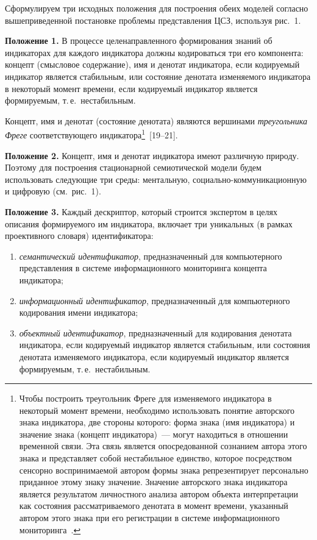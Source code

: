 \begin{multicols}{2}
   Сформулируем три исходных положения для построения обеих моделей согласно 
вышеприведенной постановке проблемы представления ЦСЗ, используя рис.~1.

   \textbf{Положение 1.} В процессе целенаправленного формирования знаний об 
индикаторах для каждого индикатора должны кодироваться три его компонента: концепт 
(смысловое содержание), имя и денотат индикатора, если кодируемый индикатор является 
стабильным, или состояние денотата изменяемого индикатора в некоторый момент времени, 
если кодируемый индикатор является формируемым, т.\,е.\ нестабильным.
   
   Концепт, имя и денотат (состояние денотата) являются вершинами \textit{треугольника 
Фреге} соответствующего индикатора\footnote{Чтобы построить треугольник Фреге для 
изменяемого индикатора в некоторый момент времени, необходимо 
использовать понятие авторского знака 
индикатора, две стороны которого: форма знака (имя индикатора) и значение знака (концепт 
индикатора)~--- могут находиться в отношении временной связи. Эта связь является опосредованной 
сознанием автора этого знака и представляет собой нестабильное единство, которое посредством сенсорно 
воспринимаемой автором формы знака репрезентирует персонально приданное этому знаку значение. 
Значение авторского знака индикатора является результатом личностного анализа автором объекта 
интерпретации как состояния рассматриваемого денотата в момент времени, указанный автором этого 
знака при его регистрации в системе информационного мониторинга~\cite{8-zat, 15-zat}.}~[19--21].
   
   \textbf{Положение 2.} Концепт, имя и денотат индикатора имеют различную природу. 
Поэтому для построения стационарной семиотической модели будем использовать 
следующие три среды: ментальную, социально-коммуникационную и цифровую 
(см.\ рис.~1).
   
   \textbf{Положение 3.} Каждый дескриптор, который строится экспертом в целях 
описания фор\-ми\-ру\-емо\-го им индикатора, включает три уникальных (в рамках проективного 
словаря) идентификатора:
   \begin{enumerate}[(1)]
\item \textit{семантический идентификатор}, предназначенный для компьютерного 
представления в системе информационного мониторинга концепта индикатора;
\item \textit{информационный идентификатор}, предназначенный для компьютерного 
кодирования имени индикатора;
\item \textit{объектный идентификатор}, предназначенный для кодирования денотата 
индикатора, если кодируемый индикатор является стабильным, или состояния денотата 
изменяемого индикатора, если кодируемый индикатор является формируемым, т.\,е.\ 
нестабильным.
\end{enumerate}


\end{multicols}
